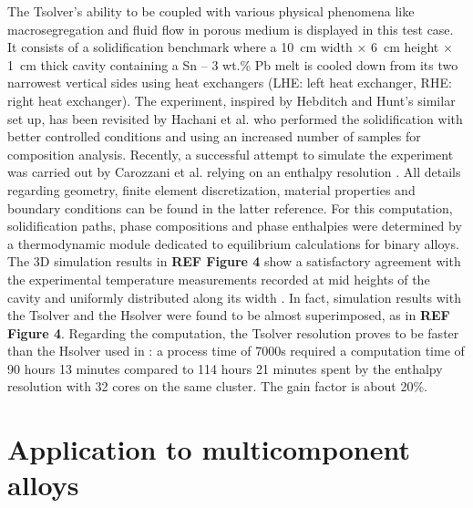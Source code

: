 The Tsolver’s ability to be coupled with various physical phenomena like macrosegregation and fluid flow 
in porous medium is displayed in this test case. It consists of a solidification benchmark where a \SI{10}{\centi \metre}
width × \SI{6}{\centi \metre} height × \SI{1}{\centi \metre} thick cavity containing a Sn – 3 wt.\% Pb melt is cooled down from its two 
narrowest vertical sides using heat exchangers (LHE: left heat exchanger, RHE: right heat exchanger). The 
experiment, inspired by Hebditch and Hunt’s \cite{hebditch_observations_1974} similar set up, has been 
revisited by Hachani et al. \cite{hachani_experimental_2012} who performed the solidification with better 
controlled conditions and using an increased number of samples for composition analysis. Recently, a successful 
attempt to simulate the experiment was carried out by Carozzani et al. relying on an enthalpy resolution 
\cite{carozzani_direct_2013}. All details regarding geometry, finite element discretization, material properties 
and boundary conditions can be found in the latter reference. 
For this computation, solidification paths, phase compositions and phase enthalpies were determined by a thermodynamic 
module dedicated to equilibrium calculations for binary alloys. The 3D simulation results in \textbf{REF Figure 4} show 
a satisfactory agreement with the experimental temperature measurements recorded at mid heights of the cavity and uniformly 
distributed along its width \cite{carozzani_direct_2013}. In fact, simulation results with the Tsolver and the Hsolver were 
found to be almost superimposed, as in \textbf{REF Figure 4}. Regarding the computation, the Tsolver resolution proves to be 
faster than the Hsolver used in \cite{carozzani_direct_2013}: a process time of 7000s required a computation time of 90 hours 
13 minutes compared to 114 hours 21 minutes spent by the enthalpy resolution with 32 cores on the same cluster. The gain factor 
is about 20\%.

\section{Application to multicomponent alloys}


